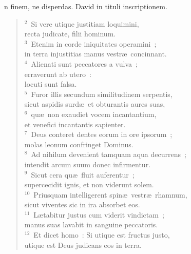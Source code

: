 \bchapter
{}n finem, ne disperdas. David in tituli inscriptionem.
\begin{flushleft}\begin{verse}\vspace{6pt}${}^{2}$~Si vere utique justitiam loquimini,\\ recta judicate, filii hominum.\\
${}^{3}$~Etenim in corde iniquitates operamini~;\\ in terra injustitias manus vestr\ae\ concinnant.\\
${}^{4}$~Alienati sunt peccatores a vulva~;\\ erraverunt ab utero~:\\ locuti sunt falsa.\\
${}^{5}$~Furor illis secundum similitudinem serpentis,\\ sicut aspidis surd\ae\ et obturantis aures suas,\\
${}^{6}$~qu\ae\ non exaudiet vocem incantantium,\\ et venefici incantantis sapienter.\\
${}^{7}$~Deus conteret dentes eorum in ore ipsorum~;\\ molas leonum confringet Dominus.\\
${}^{8}$~Ad nihilum devenient tamquam aqua decurrens~;\\ intendit arcum suum donec infirmentur.\\
${}^{9}$~Sicut cera qu\ae\ fluit auferentur~;\\ supercecidit ignis, et non viderunt solem.\\
${}^{10}$~Priusquam intelligerent spin\ae\ vestr\ae\ rhamnum,\\ sicut viventes sic in ira absorbet eos.\\
${}^{11}$~L\ae tabitur justus cum viderit vindictam~;\\ manus suas lavabit in sanguine peccatoris.\\
${}^{12}$~Et dicet homo~: Si utique est fructus justo,\\ utique est Deus judicans eos in terra.\end{verse}\end{flushleft}




